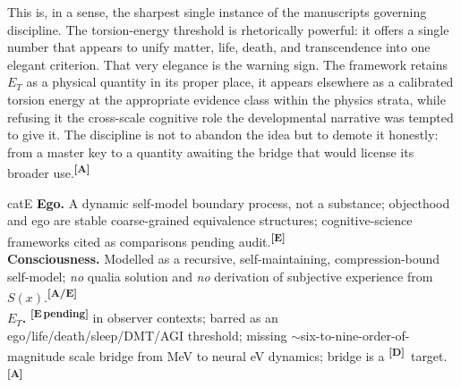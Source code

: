 \documentclass[12pt,a4paper,twoside]{article}
\theoremstyle{plain}
\theoremstyle{definition}
\theoremstyle{remark}
\newcommand{\catmark}[1]{\textsuperscript{\textsf{\textbf{[#1]}}}}
\begin{document}
\noindent This is, in a sense, the sharpest single instance of the manuscripts governing discipline. The torsion-energy threshold is rhetorically powerful: it offers a single number that appears to unify matter, life, death, and transcendence into one elegant criterion. That very elegance is the warning sign. The framework retains $E_T$ as a physical quantity in its proper place, it appears elsewhere as a calibrated torsion energy at the appropriate evidence class within the physics strata, while refusing it the cross-scale cognitive role the developmental narrative was tempted to give it. The discipline is not to abandon the idea but to demote it honestly: from a master key to a quantity awaiting the bridge that would license its broader use.\catmark{A}

\begin{evidencebox}{catE}
\textbf{Ego.} A dynamic self-model boundary process, not a substance; objecthood and ego are stable coarse-grained equivalence structures; cognitive-science
frameworks cited as comparisons pending audit.\catmark{E}\\[0.3em]
\textbf{Consciousness.} Modelled as a recursive, self-maintaining, compression-bound self-model; \emph{no} qualia solution and \emph{no} derivation
of subjective experience from $S(x)$.\catmark{A/E}\\[0.3em]
\textbf{$E_T$.} \catmark{E\,pending} in observer contexts; barred as an ego/life/death/sleep/DMT/AGI threshold; missing $\sim$six-to-nine-order-of-magnitude scale bridge from MeV to neural eV dynamics; bridge is a \catmark{D}\ target.\catmark{A}
\end{evidencebox}

\end{document}
